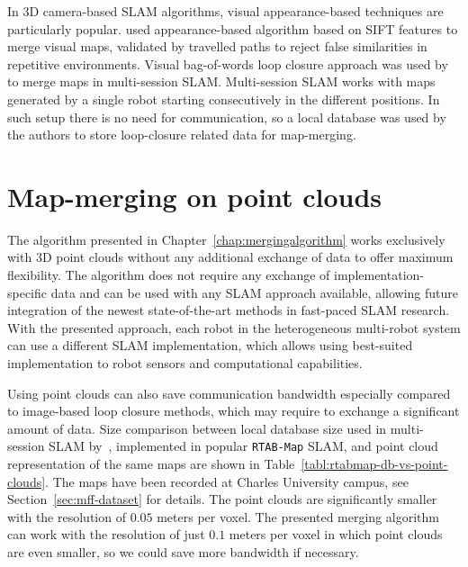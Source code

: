In \gls{3D} camera-based \gls{SLAM} algorithms, visual appearance-based techniques are particularly popular. \citet{tomono2013merging} used appearance-based algorithm based on \gls{SIFT} features to merge visual maps, validated by travelled paths to reject false similarities in repetitive environments. Visual bag-of-words loop closure approach was used by~\citet{labbe2014online} to merge maps in multi-session \gls{SLAM}. Multi-session \gls{SLAM} works with maps generated by a single robot starting consecutively in the different positions. In such setup there is no need for communication, so a local database was used by the authors to store loop-closure related data for map-merging.

\section{Map-merging on point clouds}
\label{sec:map-merging-on-point-clouds}

The algorithm presented in Chapter~\ref{chap:mergingalgorithm} works exclusively with \gls{3D} point clouds without any additional exchange of data to offer maximum flexibility. The algorithm does not require any exchange of implementation-specific data and can be used with any \gls{SLAM} approach available, allowing future integration of the newest state-of-the-art methods in fast-paced \gls{SLAM} research. With the presented approach, each robot in the heterogeneous multi-robot system can use a different \gls{SLAM} implementation, which allows using best-suited implementation to robot sensors and computational capabilities.

Using point clouds can also save communication bandwidth especially compared to image-based loop closure methods, which may require to exchange a significant amount of data. Size comparison between local database size used in multi-session \gls{SLAM} by~\citet{labbe2014online}, implemented in popular \texttt{RTAB-Map} \gls{SLAM}, and point cloud representation of the same maps are shown in Table~\ref{tabl:rtabmap-db-vs-point-clouds}. The maps have been recorded at Charles University campus, see Section~\ref{sec:mff-dataset} for details. The point clouds are significantly smaller with the resolution of $0.05$ meters per voxel. The presented merging algorithm can work with the resolution of just $0.1$ meters per voxel in which point clouds are even smaller, so we could save more bandwidth if necessary.

